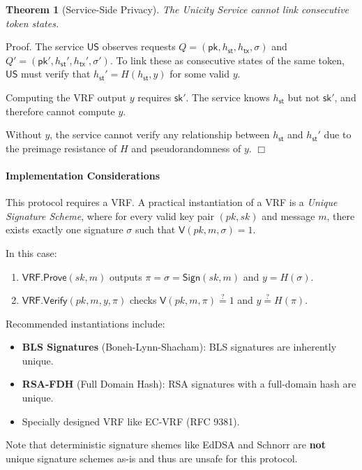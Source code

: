 \documentclass{article}
\newtheorem{theorem}{Theorem}[section]
\newenvironment{proof}{\textsf{Proof}.}{\hfill$\Box$}
\newcommand{\sigver}[0]{\mathsf{V}}
\newcommand{\pubkey}[0]{\mathsf{pk}}
\newcommand{\prikey}[0]{\mathsf{sk}}
\newcommand{\unisrv}[0]{\mathsf{US}}
\newcommand{\sthash}[0]{{h_\mathsf{st}}}
\newcommand{\txhash}[0]{{h_\mathsf{tx}}}
\begin{document}
\begin{theorem}[Service-Side Privacy]
The Unicity Service cannot link consecutive token states.
\end{theorem}

\begin{proof}
The service $\unisrv$ observes requests $Q = (\pubkey, \sthash, \txhash, \sigma)$ and $Q' = (\pubkey', \sthash', \txhash', \sigma')$. To link these as consecutive states of the same token, $\unisrv$ must verify that $\sthash' = H(\sthash, y)$ for some valid $y$.

Computing the VRF output $y$ requires $\prikey'$. The service knows $\sthash$ but not $\prikey'$, and therefore cannot compute $y$.

Without $y$, the service cannot verify any relationship between $\sthash$ and $\sthash'$ due to the preimage resistance of $H$ and pseudorandomness of $y$.
\end{proof}

\paragraph{Implementation Considerations}

This protocol requires a VRF. A practical instantiation of a VRF is a \emph{Unique Signature Scheme}, where for every valid key pair $(pk, sk)$ and message $m$, there exists exactly one signature $\sigma$ such that $\sigver(pk, m, \sigma)=1$.

In this case:
\begin{enumerate}
\item $\mathsf{VRF.Prove}(sk, m)$ outputs $\pi = \sigma = \mathsf{Sign}(sk, m)$ and $y = H(\sigma)$.
\item $\mathsf{VRF.Verify}(pk, m, y, \pi)$ checks $\sigver(pk, m, \pi) \stackrel{?}{=} 1$ and $y \stackrel{?}{=} H(\pi)$.
\end{enumerate}

\noindent Recommended instantiations include:
\begin{itemize}
\item \textbf{BLS Signatures} (Boneh-Lynn-Shacham): BLS signatures are inherently unique.
\item \textbf{RSA-FDH} (Full Domain Hash): RSA signatures with a full-domain hash are unique.
\item Specially designed VRF like EC-VRF (RFC 9381).
\end{itemize}

\noindent Note that deterministic signature shemes like EdDSA and Schnorr are \textbf{not} unique signature schemes as-is and thus are unsafe for this protocol.
\end{document}
